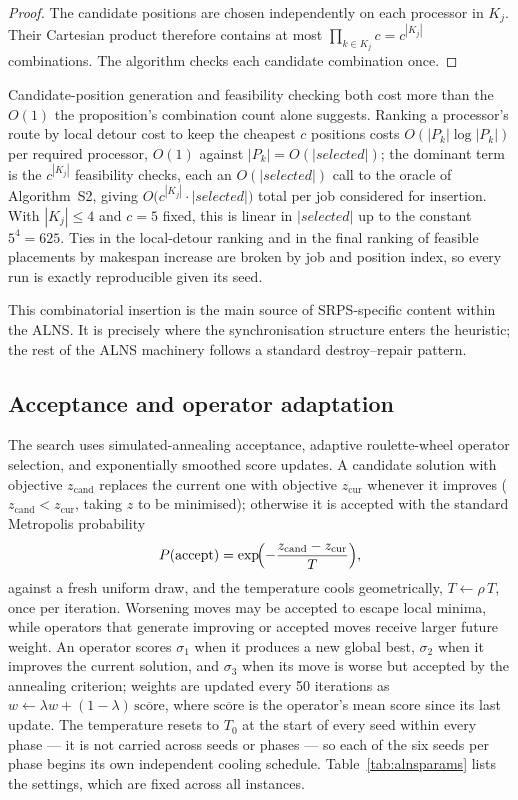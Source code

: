 \documentclass[preprint,12pt]{elsarticle}
\begin{document}
\begin{proof}
The candidate positions are chosen independently on each processor in $K_j$. Their Cartesian product therefore contains at most $\prod_{k\in K_j} c = c^{|K_j|}$ combinations. The algorithm checks each candidate combination once.
\end{proof}

Candidate-position generation and feasibility checking both cost more than the $O(1)$ the proposition's combination count alone suggests. Ranking a processor's route by local detour cost to keep the cheapest $c$ positions costs $O(|P_k|\log|P_k|)$ per required processor, $O(1)$ against $|P_k|=O(|\textit{selected}|)$; the dominant term is the $c^{|K_j|}$ feasibility checks, each an $O(|\textit{selected}|)$ call to the oracle of Algorithm~S2, giving $O\bigl(c^{|K_j|}\cdot|\textit{selected}|\bigr)$ total per job considered for insertion. With $|K_j|\le 4$ and $c=5$ fixed, this is linear in $|\textit{selected}|$ up to the constant $5^4=625$. Ties in the local-detour ranking and in the final ranking of feasible placements by makespan increase are broken by job and position index, so every run is exactly reproducible given its seed.

This combinatorial insertion is the main source of SRPS-specific content within the ALNS. It is precisely where the synchronisation structure enters the heuristic; the rest of the ALNS machinery follows a standard destroy--repair pattern.

\subsection{Acceptance and operator adaptation}

The search uses simulated-annealing acceptance, adaptive roulette-wheel operator selection, and exponentially smoothed score updates. A candidate solution with objective $z_{\text{cand}}$ replaces the current one with objective $z_{\text{cur}}$ whenever it improves ($z_{\text{cand}}<z_{\text{cur}}$, taking $z$ to be minimised); otherwise it is accepted with the standard Metropolis probability
\[
P(\text{accept}) = \exp\!\Bigl(-\frac{z_{\text{cand}}-z_{\text{cur}}}{T}\Bigr),
\]
against a fresh uniform draw, and the temperature cools geometrically, $T \leftarrow \rho\, T$, once per iteration. Worsening moves may be accepted to escape local minima, while operators that generate improving or accepted moves receive larger future weight. An operator scores $\sigma_1$ when it produces a new global best, $\sigma_2$ when it improves the current solution, and $\sigma_3$ when its move is worse but accepted by the annealing criterion; weights are updated every 50 iterations as $w \leftarrow \lambda w + (1-\lambda)\,\overline{\text{score}}$, where $\overline{\text{score}}$ is the operator's mean score since its last update. The temperature resets to $T_0$ at the start of every seed within every phase --- it is not carried across seeds or phases --- so each of the six seeds per phase begins its own independent cooling schedule. Table~\ref{tab:alnsparams} lists the settings, which are fixed across all instances.
\end{document}
